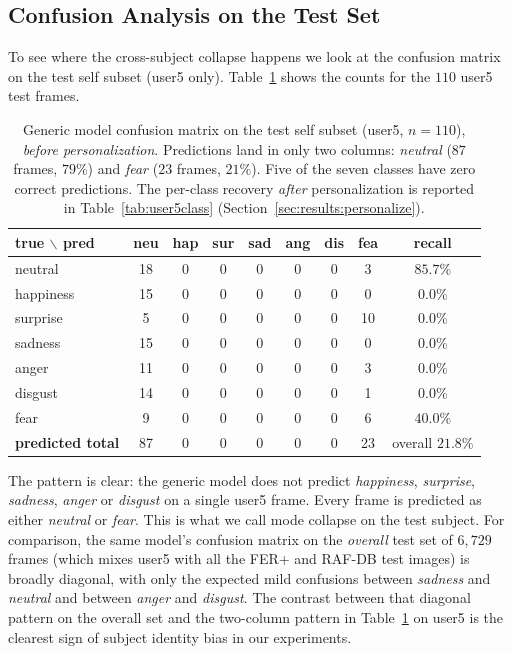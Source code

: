 \documentclass[12pt,a4paper]{article}
\begin{document}
\subsection{Confusion Analysis on the Test Set}
\label{sec:results:confusion}

To see where the cross-subject collapse happens we look at the
confusion matrix on the test self subset (user5 only).
Table~\ref{tab:selfconf} shows the counts for the $110$ user5
test frames.

\begin{table}[H]
  \centering
  \footnotesize
  \begin{tabular}{l|ccccccc|c}
    \toprule
    true $\backslash$ pred & neu & hap & sur & sad & ang & dis & fea & recall \\
    \midrule
    neutral   & 18 & 0 & 0 & 0 & 0 & 0 & 3  & $85.7\%$ \\
    happiness & 15 & 0 & 0 & 0 & 0 & 0 & 0  & $0.0\%$ \\
    surprise  & 5  & 0 & 0 & 0 & 0 & 0 & 10 & $0.0\%$ \\
    sadness   & 15 & 0 & 0 & 0 & 0 & 0 & 0  & $0.0\%$ \\
    anger     & 11 & 0 & 0 & 0 & 0 & 0 & 3  & $0.0\%$ \\
    disgust   & 14 & 0 & 0 & 0 & 0 & 0 & 1  & $0.0\%$ \\
    fear      & 9  & 0 & 0 & 0 & 0 & 0 & 6  & $40.0\%$ \\
    \midrule
    \textbf{predicted total} & 87 & 0 & 0 & 0 & 0 & 0 & 23 & overall $21.8\%$ \\
    \bottomrule
  \end{tabular}
  \caption{\footnotesize Generic model confusion matrix on the test self
  subset (user5, $n=110$), \emph{before personalization}.
  Predictions land in only two columns: \emph{neutral}
  ($87$ frames, $79\%$) and \emph{fear} ($23$ frames, $21\%$).
  Five of the seven classes have zero correct predictions.
  The per-class recovery \emph{after} personalization is
  reported in Table~\ref{tab:user5class}
  (Section~\ref{sec:results:personalize}).}
  \label{tab:selfconf}
\end{table}

The pattern is clear: the generic model does not predict
\emph{happiness}, \emph{surprise}, \emph{sadness},
\emph{anger} or \emph{disgust} on a single user5 frame. Every
frame is predicted as either \emph{neutral} or \emph{fear}.
This is what we call mode collapse on the test subject. For
comparison, the same model's confusion matrix on the
\emph{overall} test set of $6{,}729$ frames (which mixes
user5 with all the FER+ and RAF-DB test images) is broadly
diagonal, with only the expected mild confusions between
\emph{sadness} and \emph{neutral} and between \emph{anger}
and \emph{disgust}. The contrast between that diagonal
pattern on the overall set and the two-column pattern in
Table~\ref{tab:selfconf} on user5 is the clearest sign of
subject identity bias in our experiments.
\end{document}
